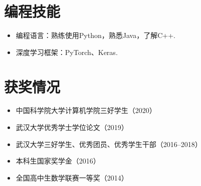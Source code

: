\documentclass{resume}
\begin{document}
\section{编程技能}
\small
\begin{itemize}
  \item 编程语言：熟练使用Python，熟悉Java，了解C++.
  \item 深度学习框架：PyTorch、Keras.
\end{itemize}

\section{获奖情况}
\begin{itemize}
  \item 中国科学院大学计算机学院三好学生（2020）
  \item 武汉大学优秀学士学位论文（2019）
  \item 武汉大学三好学生、优秀团员、优秀学生干部（2016--2018）
  \item 本科生国家奖学金（2016）
  \item 全国高中生数学联赛一等奖（2014）
\end{itemize}

\end{document}
